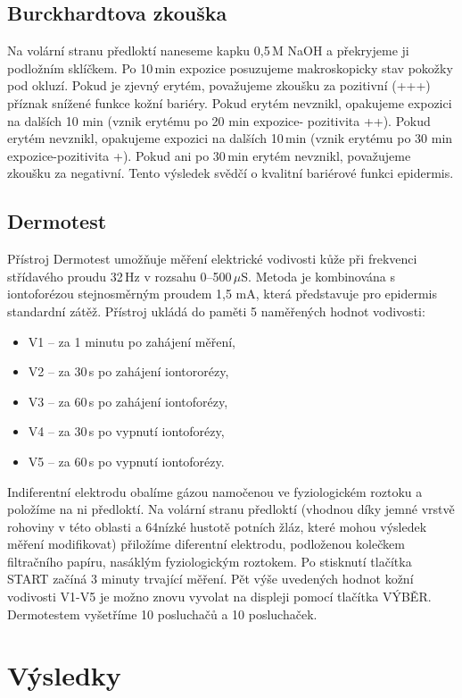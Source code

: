 \documentclass[12pt]{article}
\begin{document}
\subsection{Burckhardtova zkouška}
Na volární stranu předloktí naneseme kapku 0,5\,M NaOH a překryjeme ji podložním sklíčkem.
Po 10\,min expozice posuzujeme makroskopicky stav pokožky pod okluzí. Pokud je zjevný
erytém, považujeme zkoušku za pozitivní (+++) příznak snížené funkce kožní bariéry. Pokud
erytém nevznikl, opakujeme expozici na dalších 10 min (vznik erytému po 20 min expozice-
pozitivita ++). Pokud erytém nevznikl, opakujeme expozici na dalších 10\,min (vznik erytému po
30 min expozice-pozitivita +). Pokud ani po 30\,min erytém nevznikl, považujeme zkoušku za
negativní. Tento výsledek svědčí o kvalitní bariérové funkci epidermis.

\subsection{Dermotest}
Přístroj Dermotest umožňuje měření elektrické vodivosti kůže při frekvenci střídavého proudu
32\,Hz v rozsahu 0--500\,$\mu$S. Metoda je kombinována s iontoforézou stejnosměrným proudem 1,5
mA, která představuje pro epidermis standardní zátěž. Přístroj ukládá do paměti 5 naměřených
hodnot vodivosti:
\begin{itemize}
	\item{V1 -- za 1 minutu po zahájení měření,}
	\item{V2 -- za 30\,s po zahájení iontororézy,}
	\item{V3 -- za 60\,s po zahájení iontoforézy,}
	\item{V4 -- za 30\,s po vypnutí iontoforézy,}
	\item{V5 -- za 60\,s po vypnutí iontoforézy.}
\end{itemize}
Indiferentní elektrodu obalíme gázou namočenou ve fyziologickém roztoku a položíme na ni
předloktí. Na volární stranu předloktí (vhodnou díky jemné vrstvě rohoviny v této oblasti a
64nízké hustotě potních žláz, které mohou výsledek měření modifikovat) přiložíme diferentní
elektrodu, podloženou kolečkem filtračního papíru, nasáklým fyziologickým roztokem. Po
stisknutí tlačítka START začíná 3 minuty trvající měření. Pět výše uvedených hodnot kožní
vodivosti V1-V5 je možno znovu vyvolat na displeji pomocí tlačítka VÝBĚR. Dermotestem
vyšetříme 10 posluchačů a 10 posluchaček.

\clearpage

\section{Výsledky}
\end{document}
